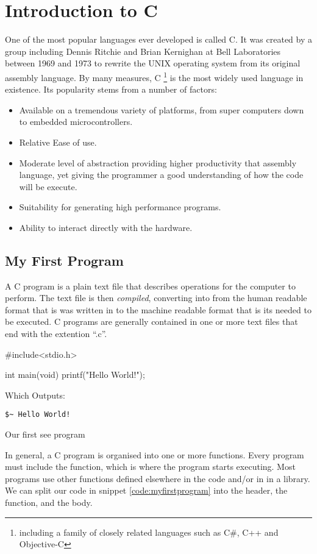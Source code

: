 \chapter{Introduction to C}

One of the most popular languages ever developed is called C. It was created by a group including Dennis Ritchie and Brian Kernighan at Bell Laboratories between 1969 and 1973 to rewrite the UNIX operating system from its original assembly language. By many measures, C \footnote{including a family of closely related languages such as C\#, C++ and Objective-C} is the most widely used language in existence. Its popularity stems from a number of factors:
\begin{itemize}
	\item Available on a tremendous variety of platforms, from super computers down to embedded microcontrollers.
	\item Relative Ease of use.
	\item Moderate level of abstraction providing higher productivity that assembly language, yet giving the programmer a good understanding of how the code will be execute.
	\item Suitability for generating high performance programs.
	\item Ability to interact directly with the hardware.
\end{itemize} 

	\section{My First Program}
		
		A C program is a plain text file that describes operations for the computer to perform. The text file is then \textit{compiled}, converting into from the human readable format that is was written in to the machine readable format that is its needed to be executed. C programs are generally contained in one or more text files that end with the extention \enquote{.c}. 
		
		\begin{listing}[h]
			\centering
			\begin{ccode}
#include<stdio.h>

int main(void) {
	printf("Hello World!\n");
}
			\end{ccode}
			Which Outputs:
			\begin{verbatim}
$~ Hello World!
			\end{verbatim}
			\caption{\label{code:myfirstprogram} Our first see program}
		\end{listing}
	
		In general, a C program is organised into one or more functions. Every program must include the  function, which is where the program starts executing. Most programs use other functions defined elsewhere in the code and/or in in a library. We can split our code in snippet \ref{code:myfirstprogram} into the header, the  function, and the body.
		
		
		
